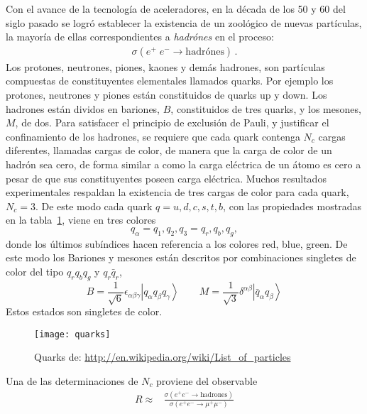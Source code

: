 Con el avance de la tecnología de aceleradores, en la década de los 50 y 60 del siglo pasado se logró establecer la existencia de un zoológico de nuevas partículas, la mayoría de ellas correspondientes a \emph{hadrónes} en el proceso:
\begin{align}
  \sigma(e^+\;e^-\rightarrow \text{hadrónes})\,.
\end{align}
Los protones, neutrones, piones, kaones y demás hadrones, son partículas compuestas de constituyentes elementales llamados quarks. Por ejemplo los protones, neutrones y piones están constituidos de quarks up y down. Los hadrones están dividos en  bariones, $B$, constituidos de tres quarks, y los mesones, $M$, de dos. Para satisfacer el principio de exclusión de Pauli, y justificar el confinamiento de los hadrones, se requiere que cada quark contenga $N_c$ cargas diferentes, llamadas cargas de color, de manera que la carga de color de un hadrón sea cero, de forma similar a como la carga eléctrica de un átomo es cero a pesar de que sus constituyentes poseen carga eléctrica. Muchos resultados experimentales respaldan la existencia de tres cargas de color para cada quark, $N_c=3$. De este modo cada quark $q=u,d,c,s,t,b$, con las propiedades mostradas en la tabla~\ref{tab:quarks}, viene en tres colores
\begin{equation}
  q_\alpha=q_1,q_2,q_3=q_r,q_b,q_g,
\end{equation}
donde los últimos subíndices hacen referencia a los colores red, blue, green. De este modo los Bariones y mesones están descritos por combinaciones singletes de color del tipo $q_r q_b q_g$ y $q_r\bar{q}_r$,
\begin{equation}
\label{eq:199qft}
  B=\frac{1}{\sqrt{6}}\epsilon_{\alpha\beta\gamma}
  \left|q_\alpha q_\beta q_\gamma\right\rangle \qquad M=\frac{1}{\sqrt{3}}\delta^{\alpha\beta}\left|\bar{q}_{\alpha}q_\beta\right\rangle
\end{equation}
Estos estados son singletes de color.

\begin{frame}
\begin{figure}
  \centering
  \texttt{[image: quarks]}
  \caption{Quarks de: \url{http://en.wikipedia.org/wiki/List_of_particles}}
  \label{tab:quarks}
\end{figure}
\end{frame}


Una de las determinaciones de $N_c$ proviene del observable
\begin{align}
  R\approx&\frac{\sigma(e^+e^-\to\text{hadrones})}{\sigma(e^+e^-\to\mu^+\mu^-)}
\end{align}

